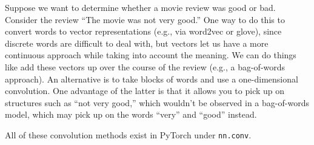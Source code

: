 \documentclass{article}
\begin{document}
\begin{example}
  Suppose we want to determine whether a movie review was good or bad. Consider the review ``The movie was not very good.'' One way to do this to convert words to vector representations (e.g., via word2vec or glove), since discrete words are difficult to deal with, but vectors let us have a more continuous approach while taking into account the meaning. We can do things like add these vectors up over the course of the review (e.g., a bag-of-words approach). An alternative is to take blocks of words and use a one-dimensional convolution. One advantage of the latter is that it allows you to pick up on structures such as ``not very good,'' which wouldn't be observed in a bag-of-words model, which may pick up on the words ``very'' and ``good'' instead.
\end{example}

\begin{remark}
All of these convolution methods exist in PyTorch under \texttt{nn.conv}.
\end{remark}
\end{document}
